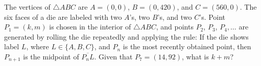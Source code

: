 The vertices of $\triangle ABC$ are $A = (0,0)$, $B = (0,420)$, and $C = (560,0)$.  The six faces of a die are labeled with two $A$'s, two $B$'s, and two $C$'s.  Point $P_1 = (k,m)$ is chosen in the interior of $\triangle ABC$, and points $P_2$, $P_3$, $P_4, \dots$ are generated by rolling the die repeatedly and applying the rule: If the die shows label $L$, where $L \in \{A, B, C\}$, and $P_n$ is the most recently obtained point, then $P_{n + 1}$ is the midpoint of $\overline{P_n L}$.  Given that $P_7 = (14,92)$, what is $k + m$?